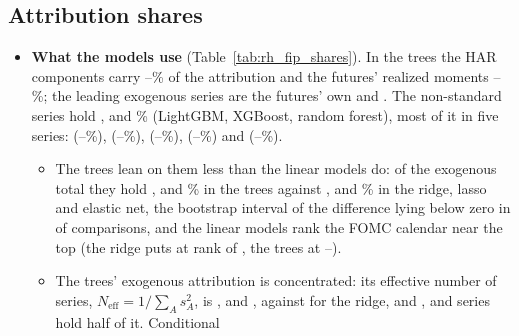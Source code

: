 \subsection{Attribution shares}
\label{app:rh_fi_rank}

\begin{itemize}
\item \textbf{What the models use} (Table~\ref{tab:rh_fip_shares}). In the trees the HAR components carry
  \rhfipHarMin--\rhfipHarMax\% of the attribution and the futures' realized moments \rhfipMomMin--\rhfipMomMax\%; the
  leading exogenous series are the futures' own \rhfipTreeTopOne{} and \rhfipTreeTopTwo. The non-standard series hold
  \rhfipLgbmNs, \rhfipXgbNs{} and \rhfipRfNs\% (LightGBM, XGBoost, random forest), most of it in five series:
  \rhfipNsOne{} (\rhfipNsOneMin--\rhfipNsOneMax\%), \rhfipNsTwo{} (\rhfipNsTwoMin--\rhfipNsTwoMax\%), \rhfipNsThree{}
  (\rhfipNsThreeMin--\rhfipNsThreeMax\%), \rhfipNsFour{} (\rhfipNsFourMin--\rhfipNsFourMax\%) and \rhfipNsFive{}
  (\rhfipNsFiveMin--\rhfipNsFiveMax\%).
  \begin{itemize}
  \item The trees lean on them less than the linear models do: of the exogenous total they hold \rhfipLgbmNsEx,
    \rhfipXgbNsEx{} and \rhfipRfNsEx\% in the trees against \rhfipRidgeNsEx, \rhfipLassoNsEx{} and \rhfipEnetNsEx\% in
    the ridge, lasso and elastic net, the bootstrap interval of the difference lying below zero in \rhfipNDLess{} of
    \rhfipNDAll{} comparisons, and the linear models rank the FOMC calendar near the top (the ridge puts
    \rhfipFomcUntil{} at rank \rhfipRidgeRankFomcUntil{} of \rhfipNExog, the trees at
    \rhfipTreeRankFomcUntilMin--\rhfipTreeRankFomcUntilMax).
  \item The trees' exogenous attribution is concentrated: its effective number of series,
    $N_{\mathrm{eff}} = 1/\sum_A s_A^2$, is \rhfipLgbmNeff, \rhfipXgbNeff{} and \rhfipRfNeff, against \rhfipRidgeNeff{}
    for the ridge, and \rhfipLgbmNHalf, \rhfipXgbNHalf{} and \rhfipRfNHalf{} series hold half of it. Conditional

\end{itemize}
\end{itemize}
